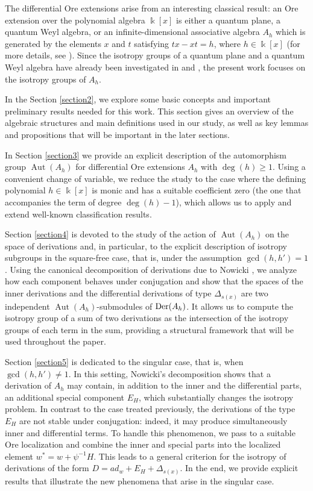\documentclass{article}
\numberwithin{equation}{section}\theoremstyle{plain}
\newcommand{\der}{{\rm Der}}
\DeclareMathOperator{\Aut}{Aut}
\begin{document}
The differential Ore extensions arise from an interesting classical result: an Ore extension over the polynomial algebra $\Bbbk[x]$ is either a quantum plane, a quantum Weyl algebra, or an infinite-dimensional associative algebra $A_h$ which is generated by the elements $x$ and $t$ satisfying $tx-xt = h$, where $h \in \Bbbk[x]$ (for more details, see \cite{SBVA2025, SBVA2024}).
Since the isotropy groups of a quantum plane and a quantum Weyl algebra have already been investigated in \cite{SBVA2025} and \cite{SBVA2024}, the present work focuses on the isotropy groups of $A_h$.

In the Section \ref{section2}, we explore some basic concepts and important preliminary results needed for this work. This section gives an overview of the algebraic structures and main definitions used in our study, as well as key lemmas and propositions that will be important in the later sections.

In Section \ref{section3} we provide an explicit description of the automorphism group
$\Aut(A_h)$ for differential Ore extensions $A_h$ with $\deg(h)\ge1$.
Using a convenient change of variable, we reduce the study to the case where the
defining polynomial $h \in \Bbbk [x]$ is monic and has a suitable coefficient zero (the one that accompanies the term of degree
$\deg(h)-1$), which allows us to apply and extend well-known classification results.

Section \ref{section4} is devoted to the study of the action of $\Aut(A_h)$ on the space of
derivations and, in particular, to the explicit description of isotropy
subgroups in the square-free case, that is, under the assumption $\gcd(h,h')=1$.
Using the canonical decomposition of derivations due to Nowicki \cite[Thm. 10.1]{Nowicki}, we analyze how
each component behaves under conjugation and show that the spaces of the inner
derivations and the differential derivations of type $\Delta_{s(x)}$ are two independent
$\Aut(A_h)$-submodules of $\der(A_h)$.
It allows us to compute the isotropy group of a sum of two derivations as the intersection of the isotropy groups of each term in the sum, providing a structural framework that will be used throughout the paper.

Section \ref{section5} is dedicated to the singular case, that is, when $\gcd(h,h')\neq 1$.
In this setting, Nowicki’s decomposition \cite[Thm. 11.2]{Nowicki} shows that a derivation of $A_h$ may contain, in addition to the inner and the differential parts, an additional special component $E_H$, which substantially changes the isotropy problem.
In contrast to the case treated previously, the derivations of the type $E_H$ are not stable under conjugation: indeed, it may produce simultaneously inner and differential terms.
To handle this phenomenon, we pass to a suitable Ore localization and combine the inner and special parts into the localized element $w^\ast=w+\psi^{-1}H$. This leads to a general criterion for the isotropy of derivations of the form $D=ad_w+E_H+\Delta_{s(x)}$.
In the end, we provide explicit results that illustrate the new phenomena that arise in the singular case.
\end{document}

